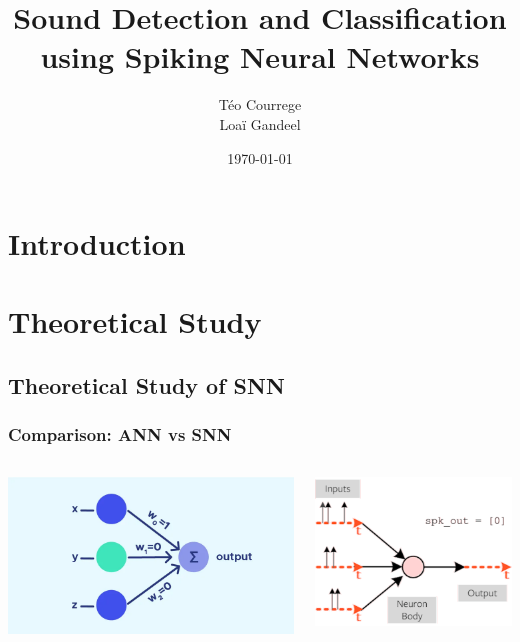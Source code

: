 \documentclass[aspectratio=169, 11pt]{beamer}
\title[Sound Detection and Classification]{\textbf{Sound Detection and Classification}\\ using Spiking Neural Networks}
\author[T. Courrege, L. Gandeel]{Téo Courrege\\Loaï Gandeel}
\date{\today}
\begin{document}
\begin{frame}[plain]
  \titlepage
\end{frame}

\section{Introduction}


\section{Theoretical Study}

\subsection{Theoretical Study of SNN}

\begin{frame}
  \frametitle{Comparison: ANN vs SNN}
  \begin{columns}
    \begin{column}{0.5\textwidth}
      \includegraphics[width=\textwidth]{image/perceptrons.png}
    \end{column}
    \begin{column}{0.5\textwidth}
      \includegraphics[width=\textwidth]{image/def1.png}
    \end{column}
  \end{columns}
\end{frame}
\end{document}
